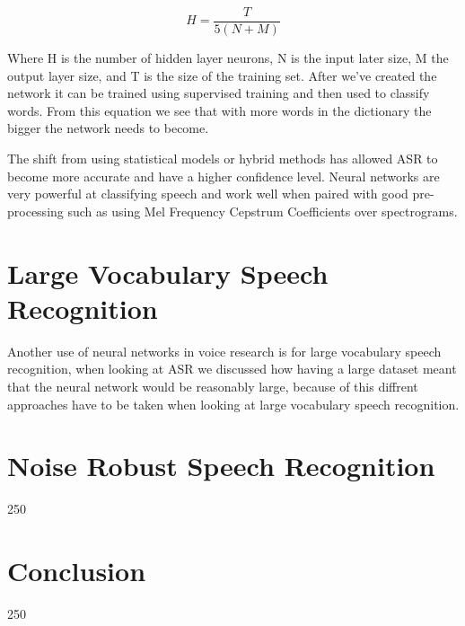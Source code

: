 \documentclass[11pt]{article}
\begin{document}
    \begin{equation}
    H = \frac{T}{5(N+M)}
    \end{equation}
    
    Where H is the number of hidden layer neurons, N is the input later size, M the output layer size, and T is the size of the training set. After we've created the network it can be trained using supervised training and then used to classify words. From this equation we see that with more words in the dictionary the bigger the network needs to become.
    
    The shift from using statistical models or hybrid methods has allowed ASR to become more accurate and have a higher confidence level. Neural networks are very powerful at classifying speech and work well when paired with good pre-processing such as using Mel Frequency Cepstrum Coefficients over spectrograms.
    

    \section{Large Vocabulary Speech Recognition}
    Another use of neural networks in voice research is for large vocabulary speech recognition, when looking at ASR we discussed how having a large dataset meant that the neural network would be reasonably large, because of this diffrent approaches have to be taken when looking at large vocabulary speech recognition.
    
    
    \section{Noise Robust Speech Recognition}
    
    250
    
    \section{Conclusion}
    250

        


\pagebreak

\printbibliography
\end{document}
